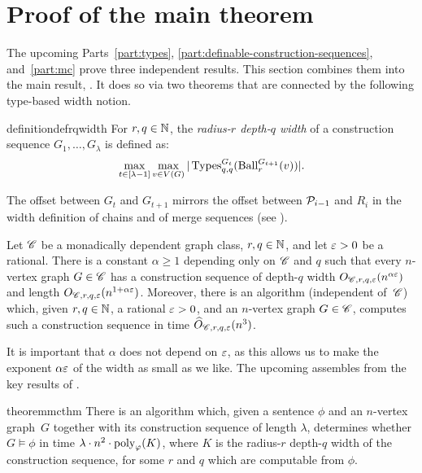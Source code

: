 \section{Proof of the main theorem}\label{sec:main-proof}

The upcoming Parts~\ref{part:types}, \ref{part:definable-construction-sequences}, and~\ref{part:mc} prove three independent results.
This section combines them into the main result, . It does so via two theorems that are connected by the following type-based width notion.


\begin{restatable}{definition}{defrqwidth}\label{res:width}
For $r,q\in\mathbb N$,
the \emph{radius-$r$ depth-$q$ width}
of a construction sequence $G_1,\ldots,G_\lambda$
is defined as:
   $$\max_{t\in[\lambda-1]}\max_{v\in V(G)}|\operatorname{Types}^{G_t}_{q,q}({\operatorname{Ball}^{G_{t+1}}_r(v)})|.$$
  \end{restatable}

The offset between $G_t$ and $G_{t+1}$ mirrors the offset between $\mathcal P_{i-1}$ and $R_i$ in the width definition of chains and of merge sequences (see ).


\begin{theorem}\label{thm:skel-few-types}
  Let $\mathscr C$ be a monadically dependent graph class, $r,q\in\mathbb N$, and let $\varepsilon>0$ be a rational.
  There is a constant $\alpha\ge1$ depending only on $\mathscr C$ and $q$ such that every $n$-vertex graph $G\in\mathscr C$
  has a construction sequence of  depth-$q$ width $O_{\mathscr C,r,q,\varepsilon}(n^{\alpha\varepsilon})$ and length $O_{\mathscr C,r,q,\varepsilon}(n^{1+\alpha\varepsilon})$. 
  Moreover, there is an algorithm (independent of~$\mathscr C$) which, given $r,q\in\mathbb N$, a rational $\varepsilon>0$, and an $n$-vertex graph $G\in\mathscr C$,
  computes such a construction sequence in time $\widehat O_{\mathscr C,r,q,\varepsilon}(n^3)$.
\end{theorem}
\noindent 
It is important that $\alpha$ does not depend on $\varepsilon$, as this allows us to make the exponent $\alpha\varepsilon$ of the width as small as we like.
The upcoming  assembles  from the key results of 
.



\newcommand{\mcdepth}{q}
\begin{restatable}{theorem}{mcthm}\label{thm:mc}
  There is an algorithm which, given
  a sentence $\phi$ and an $n$-vertex graph~$G$ together with its construction sequence of length $\lambda$, determines whether $G\models\phi$ in time
  $\lambda\cdot n^2\cdot\mathrm{poly}_{\varphi}(K)$,
  where $K$ is the radius-$r$ depth-$\mcdepth$ width of the construction sequence,
  for some $r$ and $\mcdepth$ which are computable from $\phi$.
\end{restatable}

